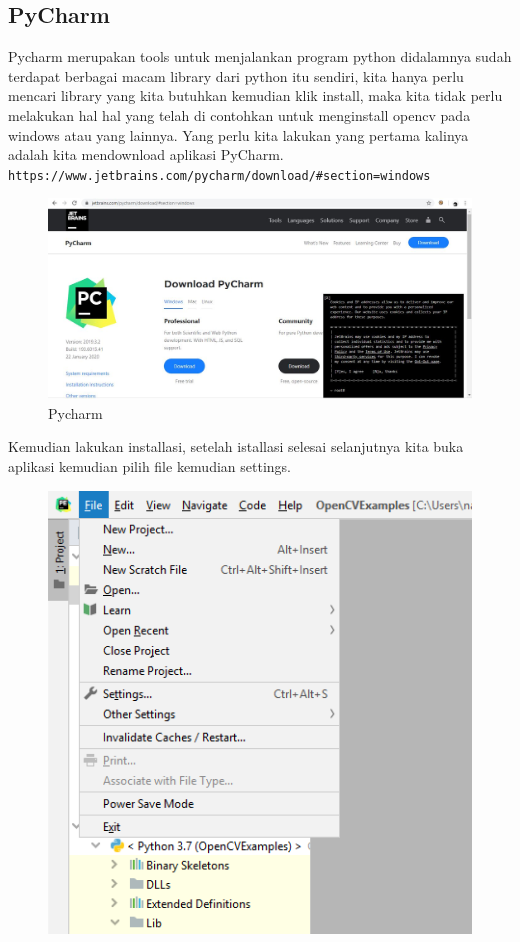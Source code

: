 \begin{enumerate}
\begin{enumerate}
\subsection {PyCharm}
Pycharm merupakan tools untuk menjalankan program python didalamnya sudah terdapat berbagai macam library dari python itu sendiri, kita hanya perlu mencari library yang kita butuhkan kemudian klik install, maka kita tidak perlu melakukan hal hal yang telah di contohkan untuk menginstall opencv pada windows atau yang lainnya. Yang perlu kita lakukan yang pertama kalinya adalah kita mendownload aplikasi PyCharm. \newline \verb|https://www.jetbrains.com/pycharm/download/#section=windows| \newline 
		\begin{figure}[ht]
		\centering
		\includegraphics[scale=0.4]{figures/1,16.jpg}
		\caption{Pycharm}
		\label{contoh}
		\end{figure}
\newpage
Kemudian lakukan installasi, setelah istallasi selesai selanjutnya kita buka aplikasi kemudian pilih file kemudian settings.
		\begin{figure}[ht]
		\centering
		\includegraphics[scale=0.4]{figures/1,17.png}

\end{figure}
\end{enumerate}
\end{enumerate}
